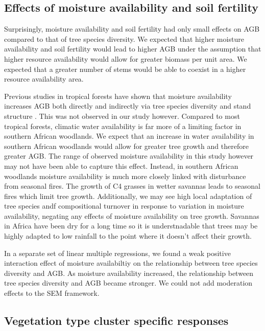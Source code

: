 \documentclass[11pt,a4paper]{article}
\begin{document}
\subsection{Effects of moisture availability and soil fertility}

Surprisingly, moisture availability and soil fertility had only small effects on AGB compared to that of tree species diversity. We expected that higher moisture availability and soil fertility would lead to higher AGB under the assumption that higher resource availability would allow for greater biomass per unit area. We expected that a greater number of stems would be able to coexist in a higher resource availability area.

Previous studies in tropical forests have shown that moisture availability increases AGB both directly and indirectly via tree species diversity and stand structure  \citep{Ali2019a, Ali2019b, Poorter2017}. This was not observed in our study however. Compared to most tropical forests, climatic water availability is far more of a limiting factor in southern African woodlands. We expect that an increase in water availability in southern African woodlands would allow for greater tree growth and therefore greater AGB. The range of observed moisture availability in this study however may not have been able to capture this effect. Instead, in southern African woodlands moisture availability is much more closely linked with disturbance from seasonal fires. The growth of C4 grasses in wetter savannas leads to seasonal fires which limit tree growth. Additionally, we may see high local adaptation of tree species andf compositional turnover in response to variation in moisture availability, negating any effects of moisture availability on tree growth. Savannas in Africa have been dry for a long time so it is understnadable that trees may be highly adapted to low rainfall to the point where it doesn't affect their growth.

In a separate set of linear multiple regressions, we found a weak positive interaction effect of moisture availabiltiy on the relationship between tree species diversity and AGB. As moisture availability increased, the relationship between tree species diversity and AGB became stronger. We could not add moderation effects to the SEM framework.

\subsection{Vegetation type cluster specific responses}
\end{document}
